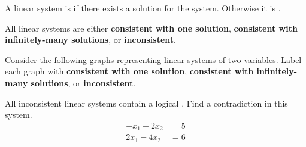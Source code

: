 \begin{applicationActivities}{1}{3}
\begin{definition}
  A linear system is  if there exists a solution for the
  system. Otherwise it is .
\end{definition}

\begin{fact}
  All linear systems are either \textbf{consistent with one solution},
  \textbf{consistent with infinitely-many solutions}, or
  \textbf{inconsistent}.
\end{fact}

\begin{activity}{5}
  Consider the following graphs representing linear systems of two variables.
  Label each graph with \textbf{consistent with one solution},
  \textbf{consistent with infinitely-many solutions}, or
  \textbf{inconsistent}.
  \begin{multicols}{4}
  \begin{center}
    \systemWithInfinitelyManySolutions
    \systemWithOneSolutionB
    \systemWithNoSolutions
    \systemWithOneSolutionA
  \end{center}
  \end{multicols}
\end{activity}

\begin{activity}{10}
  All inconsistent linear systems contain a logical .
  Find a contradiction in this system.
  \begin{align*}
  -x_1+2x_2  &=  5 \\
  2x_1-4x_2  &=  6
  \end{align*}
\end{activity}


\end{applicationActivities}
